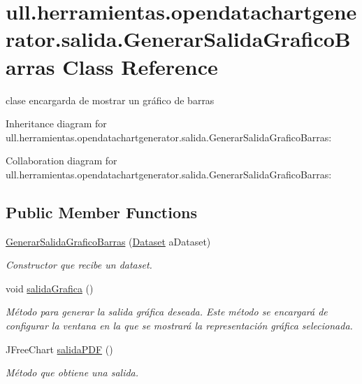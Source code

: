 \hypertarget{classull_1_1herramientas_1_1opendatachartgenerator_1_1salida_1_1_generar_salida_grafico_barras}{}\section{ull.\+herramientas.\+opendatachartgenerator.\+salida.\+Generar\+Salida\+Grafico\+Barras Class Reference}
\label{classull_1_1herramientas_1_1opendatachartgenerator_1_1salida_1_1_generar_salida_grafico_barras}


clase encargarda de mostrar un gráfico de barras  




Inheritance diagram for ull.\+herramientas.\+opendatachartgenerator.\+salida.\+Generar\+Salida\+Grafico\+Barras\+:


Collaboration diagram for ull.\+herramientas.\+opendatachartgenerator.\+salida.\+Generar\+Salida\+Grafico\+Barras\+:
\subsection*{Public Member Functions}
\begin{DoxyCompactItemize}
\item 
\mbox{\hyperlink{classull_1_1herramientas_1_1opendatachartgenerator_1_1salida_1_1_generar_salida_grafico_barras_a3a7224ced863d8c519ef607c54a2d4c8}{Generar\+Salida\+Grafico\+Barras}} (\mbox{\hyperlink{classull_1_1herramientas_1_1opendatachartgenerator_1_1_dataset}{Dataset}} a\+Dataset)
\begin{DoxyCompactList}\small\item\em Constructor que recibe un dataset. \end{DoxyCompactList}\item 
\mbox{\label{classull_1_1herramientas_1_1opendatachartgenerator_1_1salida_1_1_generar_salida_grafico_barras_a592bf29c7ab0d3a3eff9328cf48b968e}} 
void \mbox{\hyperlink{classull_1_1herramientas_1_1opendatachartgenerator_1_1salida_1_1_generar_salida_grafico_barras_a592bf29c7ab0d3a3eff9328cf48b968e}{salida\+Grafica}} ()
\begin{DoxyCompactList}\small\item\em Método para generar la salida gráfica deseada. Este método se encargará de configurar la ventana en la que se mostrará la representación gráfica selecionada. \end{DoxyCompactList}\item 
J\+Free\+Chart \mbox{\hyperlink{classull_1_1herramientas_1_1opendatachartgenerator_1_1salida_1_1_generar_salida_grafico_barras_a1b5419dd7233660c7487f6b4f218854c}{salida\+P\+DF}} ()
\begin{DoxyCompactList}\small\item\em Método que obtiene una salida. \end{DoxyCompactList}\end{DoxyCompactItemize}


